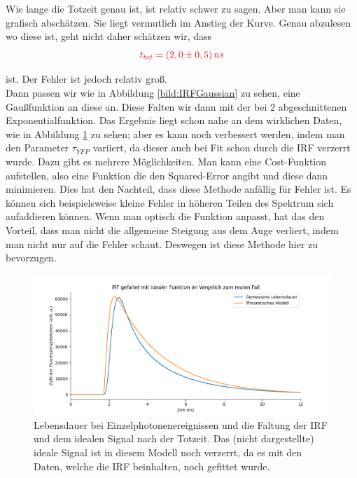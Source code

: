 Wie lange die Totzeit genau ist, ist relativ schwer zu sagen. Aber man kann sie grafisch abschätzen. Sie liegt vermutlich im Anstieg 
der Kurve. Genau abzulesen wo diese ist, geht nicht daher schätzen wir, dass\\

\begin{equation*}
    \textcolor{red}{t_{tot} = (2,0\pm0,5)\,ns}
\end{equation*}

ist. Der Fehler ist jedoch relativ groß. \\
Dann passen wir wie in Abbildung \ref{bild:IRFGaussian} zu sehen, eine Gaußfunktion an diese an. Diese Falten wir dann mit der bei 2 
abgeschnittenen Exponentialfunktion. Das Ergebnis liegt schon nahe an dem wirklichen Daten, wie in Abbildung \ref{bild:IRFconvGauss} zu sehen; aber es kann noch verbessert werden, indem man den Parameter $\tau_{YFP}$ variiert, da dieser auch bei Fit schon 
durch die IRF verzerrt wurde. Dazu gibt es mehrere Möglichkeiten. Man kann eine Cost-Funktion aufstellen, also eine Funktion die den Squared-Error angibt und diese 
dann minimieren. Dies hat den Nachteil, dass diese Methode anfällig für Fehler ist. Es können sich beispielsweise kleine Fehler in höheren 
Teilen des Spektrum sich aufaddieren können. Wenn man optisch die Funktion anpasst, hat das den Vorteil, dass man nicht die allgemeine Steigung aus dem Auge 
verliert, indem man nicht nur auf die Fehler schaut. Deswegen ist diese Methode hier zu bevorzugen.\\

\begin{figure}[h]
    \centering
    \includegraphics[width = \linewidth]{Bilder/Auswertung/IRFGaussianConvol.png}
    \caption{Lebensdauer bei Einzelphotonenereignissen und die Faltung der IRF und dem idealen Signal nach der Totzeit. Das (nicht dargestellte) ideale Signal ist in diesem 
    Modell noch verzerrt, da es mit den Daten, welche die IRF beinhalten, noch gefittet wurde.}
    \label{bild:IRFconvGauss}
\end{figure}

